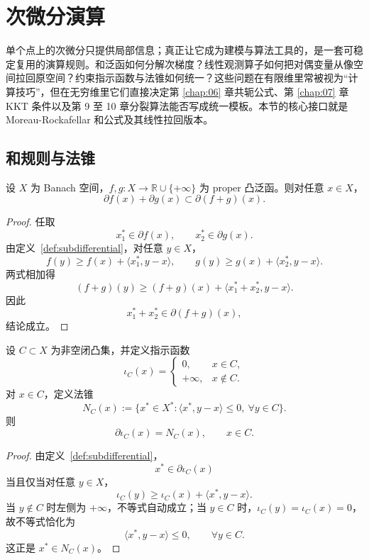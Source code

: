 \section{次微分演算}

\label{sec:5-4}

单个点上的次微分只提供局部信息；真正让它成为建模与算法工具的，是一套可稳定复用的演算规则。和泛函如何分解次梯度？线性观测算子如何把对偶变量从像空间拉回原空间？约束指示函数与法锥如何统一？这些问题在有限维里常被视为“计算技巧”，但在无穷维里它们直接决定第 \ref{chap:06} 章共轭公式、第 \ref{chap:07} 章 KKT 条件以及第 9 至 10 章分裂算法能否写成统一模板。本节的核心接口就是 Moreau-Rockafellar 和公式及其线性拉回版本。

\subsection{和规则与法锥}

\begin{proposition}[次微分和规则的基本包含式]\label{prop:subdifferential-sum-inclusion}
设 $X$ 为 Banach 空间，$f,g\colon X\to \mathbb R\cup\{+\infty\}$ 为 proper 凸泛函。则对任意 $x\in X$，
\[
\partial f(x)+\partial g(x)\subset \partial (f+g)(x).
\]
\end{proposition}

\begin{proof}
任取
\[
x_1^\ast\in \partial f(x),\qquad x_2^\ast\in \partial g(x).
\]
由定义~\ref{def:subdifferential}，对任意 $y\in X$，
\[
f(y)\ge f(x)+\langle x_1^\ast,y-x\rangle,
\qquad
g(y)\ge g(x)+\langle x_2^\ast,y-x\rangle.
\]
两式相加得
\[
(f+g)(y)\ge (f+g)(x)+\langle x_1^\ast+x_2^\ast,y-x\rangle.
\]
因此
\[
x_1^\ast+x_2^\ast\in \partial (f+g)(x),
\]
结论成立。
\end{proof}

\begin{corollary}[指示函数与法锥]\label{cor:normal-cone-indicator}
设 $C\subset X$ 为非空闭凸集，并定义指示函数
\[
\iota_C(x)=
\begin{cases}
0, & x\in C,\\
+\infty, & x\notin C.
\end{cases}
\]
对 $x\in C$，定义法锥
\[
N_C(x):=\{x^\ast\in X^\ast:\langle x^\ast,y-x\rangle\le 0,\ \forall y\in C\}.
\]
则
\[
\partial \iota_C(x)=N_C(x),\qquad x\in C.
\]
\end{corollary}

\begin{proof}
由定义~\ref{def:subdifferential}，
\[
x^\ast\in \partial \iota_C(x)
\]
当且仅当对任意 $y\in X$，
\[
\iota_C(y)\ge \iota_C(x)+\langle x^\ast,y-x\rangle.
\]
当 $y\notin C$ 时左侧为 $+\infty$，不等式自动成立；当 $y\in C$ 时，$\iota_C(y)=\iota_C(x)=0$，故不等式恰化为
\[
\langle x^\ast,y-x\rangle\le 0,\qquad \forall y\in C.
\]
这正是 $x^\ast\in N_C(x)$。
\end{proof}

